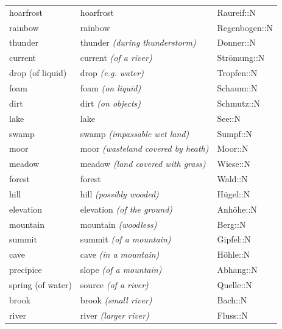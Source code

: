 \begin{center}
\begin{longtable}{lll}
{\sc \lowercase{	HOARFROST	}}	&	hoarfrost		&	Raureif::N	\\
{\sc \lowercase{	RAINBOW	}}	&	rainbow		&	Regenbogen::N	\\
{\sc \lowercase{	THUNDER	}}	&	thunder	\textit{\footnotesize (during thunderstorm)}	&	Donner::N	\\
{\sc \lowercase{	CURRENT	}}	&	current	\textit{\footnotesize (of a river)}	&	Strömung::N	\\
{\sc \lowercase{	DROP \footnotesize (OF LIQUID)	}}	&	drop	\textit{\footnotesize (e.g. water)}	&	Tropfen::N	\\
{\sc \lowercase{	FOAM	}}	&	foam	\textit{\footnotesize (on liquid)}	&	Schaum::N	\\
{\sc \lowercase{	DIRT	}}	&	dirt	\textit{\footnotesize (on objects)}	&	Schmutz::N	\\
{\sc \lowercase{	LAKE	}}	&	lake		&	See::N	\\
{\sc \lowercase{	SWAMP	}}	&	swamp	\textit{\footnotesize (impassable wet land)}	&	Sumpf::N	\\
{\sc \lowercase{	MOOR	}}	&	moor	\textit{\footnotesize (wasteland covered by heath)}	&	Moor::N	\\
{\sc \lowercase{	MEADOW	}}	&	meadow	\textit{\footnotesize (land covered with grass)}	&	Wiese::N	\\
{\sc \lowercase{	FOREST	}}	&	forest		&	Wald::N	\\
{\sc \lowercase{	HILL	}}	&	hill	\textit{\footnotesize (possibly wooded)}	&	Hügel::N	\\
{\sc \lowercase{	ELEVATION	}}	&	elevation	\textit{\footnotesize (of the ground)}	&	Anhöhe::N	\\
{\sc \lowercase{	MOUNTAIN	}}	&	mountain	\textit{\footnotesize (woodless)}	&	Berg::N	\\
{\sc \lowercase{	SUMMIT	}}	&	summit	\textit{\footnotesize (of a mountain)}	&	Gipfel::N	\\
{\sc \lowercase{	CAVE	}}	&	cave	\textit{\footnotesize (in a mountain)}	&	Höhle::N	\\
{\sc \lowercase{	PRECIPICE	}}	&	slope	\textit{\footnotesize (of a mountain)}	&	Abhang::N	\\
{\sc \lowercase{	SPRING \footnotesize (OF WATER)	}}	&	source	\textit{\footnotesize (of a river)}	&	Quelle::N	\\
{\sc \lowercase{	BROOK	}}	&	brook	\textit{\footnotesize (small river)}	&	Bach::N	\\
{\sc \lowercase{	RIVER	}}	&	river	\textit{\footnotesize (larger river)}	&	Fluss::N	\\

\end{longtable}
\end{center}
